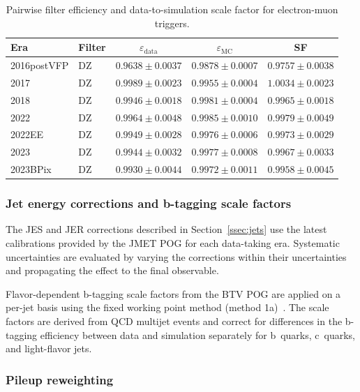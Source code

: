 \begin{table}[htbp]
\centering
\caption{Pairwise filter efficiency and data-to-simulation scale factor for electron-muon triggers.}
\label{tab:pair_emu}
\small
\begin{tabular}{llccc}
\hline\hline
Era & Filter & $\varepsilon_\text{data}$ & $\varepsilon_\text{MC}$ & SF \\
\hline
2016postVFP & DZ & $0.9638 \pm 0.0037$ & $0.9878 \pm 0.0007$ & $0.9757 \pm 0.0038$ \\
2017         & DZ & $0.9989 \pm 0.0023$ & $0.9955 \pm 0.0004$ & $1.0034 \pm 0.0023$ \\
2018         & DZ & $0.9946 \pm 0.0018$ & $0.9981 \pm 0.0004$ & $0.9965 \pm 0.0018$ \\
2022         & DZ & $0.9964 \pm 0.0048$ & $0.9985 \pm 0.0010$ & $0.9979 \pm 0.0049$ \\
2022EE       & DZ & $0.9949 \pm 0.0028$ & $0.9976 \pm 0.0006$ & $0.9973 \pm 0.0029$ \\
2023         & DZ & $0.9944 \pm 0.0032$ & $0.9977 \pm 0.0008$ & $0.9967 \pm 0.0033$ \\
2023BPix     & DZ & $0.9930 \pm 0.0044$ & $0.9972 \pm 0.0011$ & $0.9958 \pm 0.0045$ \\
\hline\hline
\end{tabular}
\end{table}

\subsubsection*{Jet energy corrections and b-tagging scale factors}

The JES and JER corrections described in Section~\ref{ssec:jets} use the latest calibrations provided by the JMET POG for each data-taking era. Systematic uncertainties are evaluated by varying the corrections within their uncertainties and propagating the effect to the final observable.

Flavor-dependent b-tagging scale factors from the BTV POG are applied on a per-jet basis using the fixed working point method (method 1a)~\cite{CMS:2017wtu}. The scale factors are derived from QCD multijet events and correct for differences in the b-tagging efficiency between data and simulation separately for b~quarks, c~quarks, and light-flavor jets.

\subsubsection*{Pileup reweighting}

